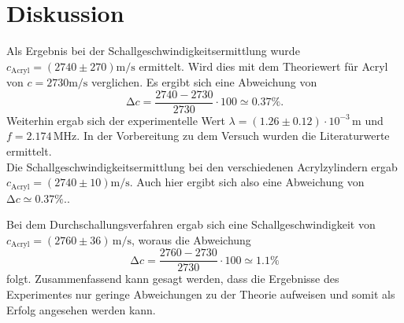 \section{Diskussion}
\label{sec:Diskussion}
Als Ergebnis bei der Schallgeschwindigkeitsermittlung wurde $c_\text{Acryl} = (2740 \pm 270) \unit{\meter / \second}$ ermittelt.
Wird dies mit dem Theoriewert für Acryl von $c = 2730 \unit{\meter / \second}$ verglichen.
Es ergibt sich eine Abweichung von 
\begin{equation*}
    \increment c = \frac{2740  - 2730}{2730} \cdot 100 \simeq 0.37 \%.
\end{equation*}
Weiterhin ergab sich der experimentelle Wert $\lambda = (1.26 \pm 0.12) \cdot 10^{-3} \, \unit\meter$ und $f = 2.174 \, \unit{\mega\hertz}$.
In der Vorbereitung zu dem Versuch wurden die Literaturwerte ermittelt. %
\\

Die Schallgeschwindigkeitsermittlung bei den verschiedenen Acrylzylindern ergab $c_\text{Acryl} = (2740 \pm 10) \unit{\meter / \second}$.
Auch hier ergibt sich also eine Abweichung von $\increment c \simeq 0.37 \%.$.

Bei dem Durchschallungsverfahren ergab sich eine Schallgeschwindigkeit von $c_\text{Acryl} = (2760 \pm 36)  \, \unit{\meter / \second}$,
woraus die Abweichung 
\begin{equation*}
    \increment c = \frac{2760  - 2730}{2730} \cdot 100 \simeq 1.1 \%
\end{equation*}
folgt.
Zusammenfassend kann gesagt werden, dass die Ergebnisse des Experimentes nur geringe Abweichungen zu der Theorie aufweisen und somit als Erfolg angesehen werden kann.